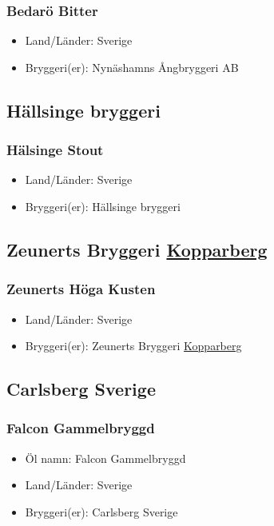 \documentclass[11pt]{article}
\begin{document}
\subsubsection{Bedarö Bitter}
\label{sec:orgf86d2f8}
\begin{itemize}
\item Land/Länder: Sverige
\item Bryggeri(er): Nynäshamns Ångbryggeri AB
\end{itemize}
\subsection{Hällsinge bryggeri}
\label{sec:org729f07a}
\subsubsection{Hälsinge Stout}
\label{sec:orgde1a518}
\begin{itemize}
\item Land/Länder: Sverige
\item Bryggeri(er): Hällsinge bryggeri
\end{itemize}
\subsection{Zeunerts Bryggeri \underline{Kopparberg}}
\label{sec:org9187fb9}
\subsubsection{Zeunerts Höga Kusten}
\label{sec:org350b329}
\begin{itemize}
\item Land/Länder: Sverige
\item Bryggeri(er): Zeunerts Bryggeri \uline{Kopparberg}
\end{itemize}
\subsection{Carlsberg Sverige}
\label{sec:orge972831}
\subsubsection{Falcon Gammelbryggd}
\label{sec:org0287d3f}
\begin{itemize}
\item Öl namn: Falcon Gammelbryggd
\item Land/Länder: Sverige
\item Bryggeri(er): Carlsberg Sverige
\end{itemize}
\end{document}
